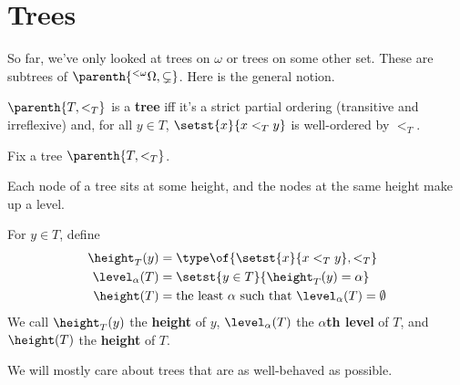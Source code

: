 \section{Trees}

So far, we've only looked at trees on $\omega$ or trees on some other set. These are subtrees of $\parenth{{^{<\omega}\Omega, \subsetneq}}$. Here is the general notion.

\begin{boxdefinition}[Tree]
    $\parenth{T, <_T}$ is a \textbf{tree} iff it's a strict partial ordering (transitive and irreflexive) and, for all $y \in T$, $\setst{x}{x <_T y}$ is well-ordered by $<_T$.
\end{boxdefinition}

Fix a tree $\parenth{T, <_T}$.

Each node of a tree sits at some height, and the nodes at the same height make up a level.

\begin{boxdefinition}
    For $y \in T$, define
    \begin{align*}
        \height_T(y) &= \type\of{\setst{x}{x <_T y}, <_T} \\
        \level_{\alpha}(T) &= \setst{y \in T}{\height_T(y) = \alpha} \\
        \height(T) &= \text{the least $\alpha$ such that $\level_{\alpha}(T) = \emptyset$}
    \end{align*}
    We call $\height_T(y)$ the \textbf{height} of $y$, $\level_{\alpha}(T)$ the \textbf{$\alpha$th level} of $T$, and $\height(T)$ the \textbf{height} of $T$.
\end{boxdefinition}

We will mostly care about trees that are as well-behaved as possible.


